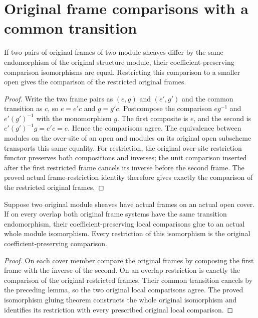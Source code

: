 \section{Original frame comparisons with a common transition}

\begin{lemma}
\label{lem:scheme-original-common-frame-transition}
\leanok
If two pairs of original frames of two module sheaves differ by the same
endomorphism of the original structure module, their coefficient-preserving
comparison isomorphisms are equal. Restricting this comparison to a
smaller open gives the comparison of the restricted original frames.
\end{lemma}
\begin{proof}
Write the two frame pairs as $(e,g)$ and $(e',g')$ and the common
transition as $c$, so $e=e'c$ and $g=g'c$. Postcompose the comparison
$eg^{-1}$ and $e'(g')^{-1}$ with the monomorphism $g$. The first
composite is $e$, and the second is $e'(g')^{-1}g=e'c=e$. Hence the
comparisons agree. The equivalence between modules on the over-site
of an open and modules on its original open subscheme transports this
same equality. For restriction, the original over-site restriction
functor preserves both compositions and inverses; the unit comparison
inserted after the first restricted frame cancels its inverse before
the second frame. The proved actual frame-restriction identity therefore
gives exactly the comparison of the restricted original frames.
\end{proof}

\begin{theorem}
\label{thm:scheme-original-frame-gluing}
\leanok
Suppose two original module sheaves have actual frames on an actual open
cover. If on every overlap both original frame systems have the same
transition endomorphism, their coefficient-preserving local comparisons
glue to an actual whole module isomorphism. Every restriction of this
isomorphism is the original coefficient-preserving comparison.
\end{theorem}
\begin{proof}
On each cover member compare the original frames by composing the first
frame with the inverse of the second. On an overlap restriction is
exactly the comparison of the original restricted frames. Their common
transition cancels by the preceding lemma, so the two original local
comparisons agree. The proved isomorphism gluing theorem constructs the
whole original isomorphism and identifies its restriction with every
prescribed original local comparison.
\end{proof}
